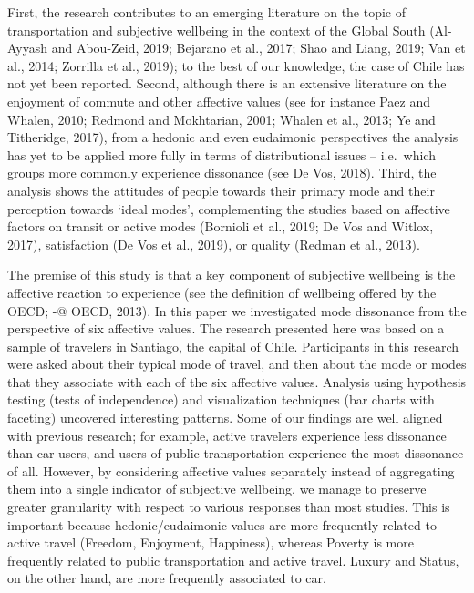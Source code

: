 \documentclass[]{elsarticle} %
\begin{document}
First, the research contributes to an emerging literature on the topic
of transportation and subjective wellbeing in the context of the Global
South (Al-Ayyash and Abou-Zeid, 2019; Bejarano et al., 2017; Shao and
Liang, 2019; Van et al., 2014; Zorrilla et al., 2019); to the best of
our knowledge, the case of Chile has not yet been reported. Second,
although there is an extensive literature on the enjoyment of commute
and other affective values (see for instance Paez and Whalen, 2010;
Redmond and Mokhtarian, 2001; Whalen et al., 2013; Ye and Titheridge,
2017), from a hedonic and even eudaimonic perspectives the analysis has
yet to be applied more fully in terms of distributional issues --
i.e.~which groups more commonly experience dissonance (see De Vos,
2018). Third, the analysis shows the attitudes of people towards their
primary mode and their perception towards `ideal modes', complementing
the studies based on affective factors on transit or active modes
(Bornioli et al., 2019; De Vos and Witlox, 2017), satisfaction (De Vos
et al., 2019), or quality (Redman et al., 2013).

The premise of this study is that a key component of subjective
wellbeing is the affective reaction to experience (see the definition of
wellbeing offered by the OECD; -@ OECD, 2013). In this paper we
investigated mode dissonance from the perspective of six affective
values. The research presented here was based on a sample of travelers
in Santiago, the capital of Chile. Participants in this research were
asked about their typical mode of travel, and then about the mode or
modes that they associate with each of the six affective values.
Analysis using hypothesis testing (tests of independence) and
visualization techniques (bar charts with faceting) uncovered
interesting patterns. Some of our findings are well aligned with
previous research; for example, active travelers experience less
dissonance than car users, and users of public transportation experience
the most dissonance of all. However, by considering affective values
separately instead of aggregating them into a single indicator of
subjective wellbeing, we manage to preserve greater granularity with
respect to various responses than most studies. This is important
because hedonic/eudaimonic values are more frequently related to active
travel (Freedom, Enjoyment, Happiness), whereas Poverty is more
frequently related to public transportation and active travel. Luxury
and Status, on the other hand, are more frequently associated to car.
\end{document}
